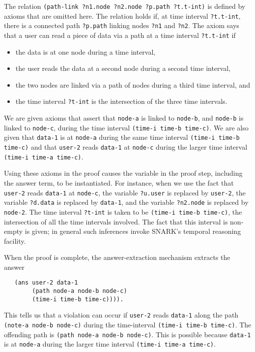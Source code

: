 The relation \verb'(path-link ?n1.node ?n2.node ?p.path ?t.t-int)' is defined by axioms that are omitted here.
The relation holds if, at time interval \verb'?t.t-int', there is a connected path \verb'?p.path' linking nodes \verb'?n1' and \verb'?n2'. 
The axiom says that a user can read a piece of data via a path at a time interval \verb'?t.t-int' if
\begin{itemize}
\item the data is at one node during a time interval,
\item the user reads the data at a second node during a second time interval,
\item the two nodes are linked via a path of nodes during a third time interval, and
\item the time interval \verb'?t-int' is the intersection of the three time intervals.
\end{itemize}

We are given axioms that assert that \verb'node-a' is linked to \verb'node-b', and \verb'node-b' is linked to \verb'node-c', during the time interval \verb'(time-i time-b time-c)'. We are also given that \verb'data-1' is at \verb'node-a' during the same time interval 
\verb'(time-i time-b time-c)' and that \verb'user-2' reads \verb'data-1' at \verb'node-c' during the larger time interval \verb'(time-i time-a time-c)'.  

Using these axioms in the proof causes the variable in the proof step, including the answer term, to be instantiated.  
For instance, when we use the fact that \verb'user-2' reads \verb'data-1' at \verb'node-c', the variable \verb'?u.user' is replaced by \verb'user-2', the variable \verb'?d.data' is replaced by \verb'data-1', and the variable \verb'?n2.node' is replaced by \verb'node-2'.  
The time interval \verb'?t-int' is taken to be \verb'(time-i time-b time-c)', the intersection of all the time intervals involved. The fact that this interval is non-empty is given; in general such inferences invoke SNARK's temporal reasoning facility. 

When the proof is complete, the answer-extraction mechanism extracts the answer
\begin{verbatim} 
   (ans user-2 data-1 
        (path node-a node-b node-c)
        (time-i time-b time-c)))).
\end{verbatim}
This tells us that a violation can occur if \verb'user-2' reads \verb'data-1' along the path \verb'(note-a node-b node-c)' during the time-interval \verb'(time-i time-b time-c)'. 
The offending path is \verb'(path node-a node-b node-c)'. 
This is possible because \verb'data-1' is at \verb'node-a' during the larger time interval 
\verb'(time-i time-a time-c)'.


